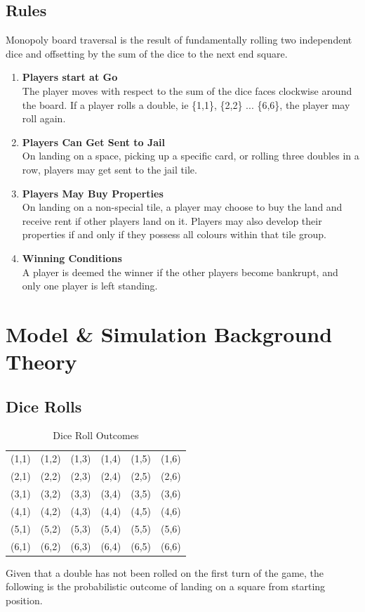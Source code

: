 \documentclass[12pt]{article}
\begin{document}
\subsection{Rules}
Monopoly board traversal is the result of fundamentally rolling two independent dice and offsetting by the sum of the dice to the next end square. 
\begin{enumerate}
  \item \textbf{Players start at Go} \hfill \\
  The player moves with respect to the sum of the dice faces clockwise around the board. If a player rolls a double, ie \{1,1\}, \{2,2\} ... \{6,6\}, the player may roll again.
  \item \textbf{Players Can Get Sent to Jail} \hfill \\
  On landing on a space, picking up a specific card, or rolling three doubles in a row, players may get sent to the jail tile.
  \item \textbf{Players May Buy Properties} \hfill \\
  On landing on a non-special tile, a player may choose to buy the land and receive rent if other players land on it. Players may also develop their properties if and only if they possess all colours within that tile group.
  \item \textbf{Winning Conditions} \hfill \\
  A player is deemed the winner if the other players become bankrupt, and only one player is left standing.
\end{enumerate}
\section{Model \& Simulation Background Theory}
\subsection{Dice Rolls}
\begin{table}[h]
\centering
\label{Dice Roll Outcomes}
\begin{tabular}{cccccc}
(1,1) & (1,2) & (1,3) & (1,4) & (1,5) & (1,6) \\
(2,1) & (2,2) & (2,3) & (2,4) & (2,5) & (2,6) \\
(3,1) & (3,2) & (3,3) & (3,4) & (3,5) & (3,6) \\
(4,1) & (4,2) & (4,3) & (4,4) & (4,5) & (4,6) \\
(5,1) & (5,2) & (5,3) & (5,4) & (5,5) & (5,6) \\
(6,1) & (6,2) & (6,3) & (6,4) & (6,5) & (6,6)
\end{tabular}
\caption{Dice Roll Outcomes}
\end{table}
Given that a double has not been rolled on the first turn of the game, the following is the probabilistic outcome of landing on a square from starting position.
\end{document}
